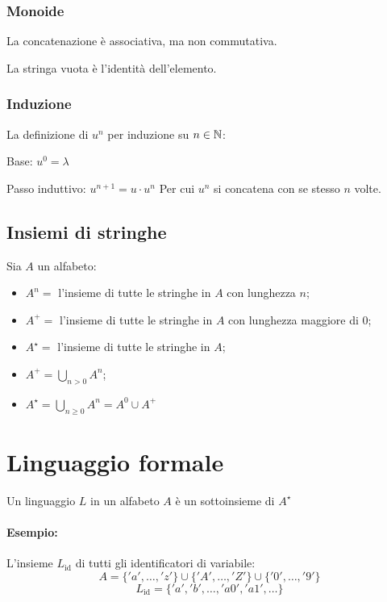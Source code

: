 \subsubsection{Monoide}
La concatenazione è associativa, ma non commutativa.

La stringa vuota è l'identità dell'elemento.
\subsubsection{Induzione}
La definizione di $u^n$ per induzione su $n \in \mathbb{N}$:

Base: $u^0 = \lambda$

Passo induttivo: $u^{n+1} = u \cdot u^n$
Per cui $u^n$ si concatena con se stesso $n$ volte.
\subsection{Insiemi di stringhe}
\begin{theorem}
  Sia $A$ un alfabeto:
  \begin{itemize}
    \item $A^n =$ l'insieme di tutte le stringhe in $A$ con lunghezza $n$;
    \item $A^+ =$ l'insieme di tutte le stringhe in $A$ con lunghezza maggiore
      di $0$;
    \item $A^\star =$ l'insieme di tutte le stringhe in $A$;
    \item $A^+ = \bigcup_{n>0}A^n$;
    \item $A^\star = \bigcup_{n\geq0}A^n=A^0\cup A^+$
  \end{itemize}
\end{theorem}

\section{Linguaggio formale}
\begin{theorem}
  Un linguaggio $L$ in un alfabeto $A$ è un sottoinsieme di $A^\star$
\end{theorem}

\paragraph{Esempio:}
L'insieme $L_{\text{id}}$ di tutti gli identificatori di variabile:
\[A=\{'a',\dots,'z'\}\cup\{'A',\dots,'Z'\}\cup\{'0',\dots,'9'\}\]
\[L_{\text{id}}=\{'a','b',\dots,'a0','a1',\dots\}\]


